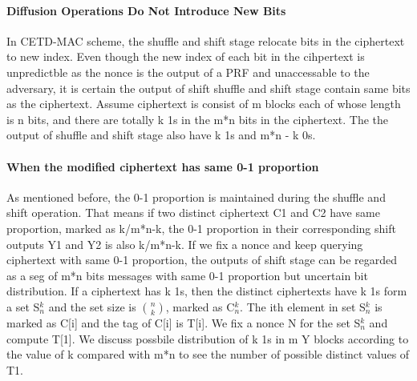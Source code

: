 \documentclass{article}
\begin{document}
\paragraph{Diffusion Operations Do Not Introduce New Bits}
In CETD-MAC scheme, the shuffle and shift stage relocate bits in the ciphertext to new index. Even though the new index of each bit in the cihpertext is unpredictble as the nonce is the output of a PRF and unaccessable to the adversary, it is certain the output of shift shuffle and shift stage contain same bits as the ciphertext. Assume ciphertext is consist of m blocks each of whose length is n bits, and there are totally k 1s in the m*n bits in the ciphertext. The the output of shuffle and shift stage also have k 1s and m*n - k 0s. 

\paragraph{When the modified ciphertext has same 0-1 proportion}
As mentioned before, the 0-1 proportion is maintained during the shuffle and shift operation. That means if two distinct ciphertext C1 and C2 have same proportion, marked as k/m*n-k, the 0-1 proportion in their corresponding shift outputs Y1 and Y2 is also k/m*n-k.  
If we fix a nonce and keep querying ciphertext with same 0-1 proportion, the outputs of shift stage can be regarded as a seg of m*n bits messages with same 0-1 proportion but uncertain bit distribution. If a ciphertext has k 1s, then the distinct ciphertexts have k 1s form a set S$_{n}^{k}$ and the set size is $\binom{n}{k}$, marked as C$_{n}^{k}$. The ith element in set S$_{n}^{k}$ is marked as C[i] and the tag of C[i] is T[i].   
We fix a nonce N for the set S$_{n}^{k}$ and compute T[1]. We discuss possbile distribution of k 1s in m Y blocks according to the value of k compared with m*n to see the number of possible distinct values of T1. 
\end{document}
